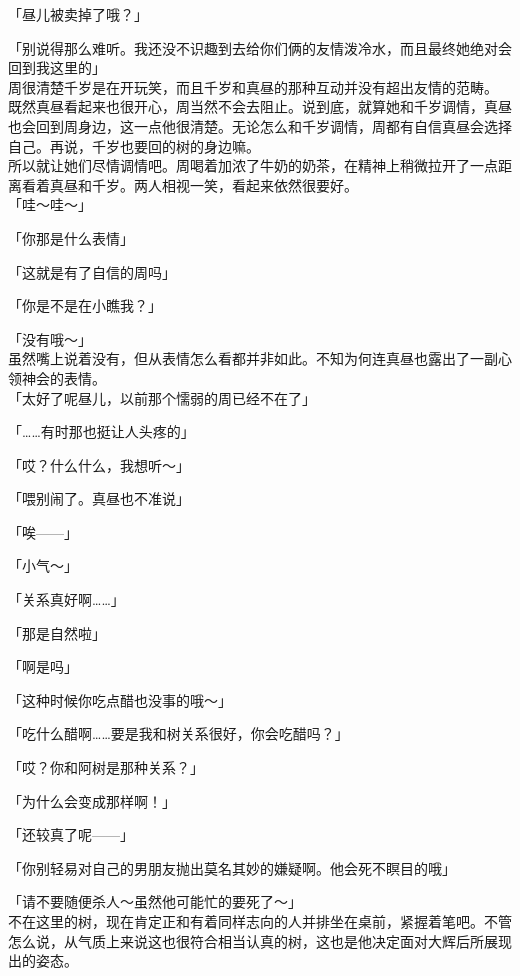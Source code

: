 「昼儿被卖掉了哦？」

「别说得那么难听。我还没不识趣到去给你们俩的友情泼冷水，而且最终她绝对会回到我这里的」\\

周很清楚千岁是在开玩笑，而且千岁和真昼的那种互动并没有超出友情的范畴。\\

既然真昼看起来也很开心，周当然不会去阻止。说到底，就算她和千岁调情，真昼也会回到周身边，这一点他很清楚。无论怎么和千岁调情，周都有自信真昼会选择自己。再说，千岁也要回的树的身边嘛。\\

所以就让她们尽情调情吧。周喝着加浓了牛奶的奶茶，在精神上稍微拉开了一点距离看着真昼和千岁。两人相视一笑，看起来依然很要好。\\

「哇～哇～」

「你那是什么表情」

「这就是有了自信的周吗」

「你是不是在小瞧我？」

「没有哦～」\\

虽然嘴上说着没有，但从表情怎么看都并非如此。不知为何连真昼也露出了一副心领神会的表情。\\

「太好了呢昼儿，以前那个懦弱的周已经不在了」

「……有时那也挺让人头疼的」

「哎？什么什么，我想听～」

「喂别闹了。真昼也不准说」

「唉——」

「小气～」

「关系真好啊……」

「那是自然啦」

「啊是吗」

「这种时候你吃点醋也没事的哦～」

「吃什么醋啊……要是我和树关系很好，你会吃醋吗？」

「哎？你和阿树是那种关系？」

「为什么会变成那样啊！」

「还较真了呢——」

「你别轻易对自己的男朋友抛出莫名其妙的嫌疑啊。他会死不瞑目的哦」

「请不要随便杀人～虽然他可能忙的要死了～」\\

不在这里的树，现在肯定正和有着同样志向的人并排坐在桌前，紧握着笔吧。不管怎么说，从气质上来说这也很符合相当认真的树，这也是他决定面对大辉后所展现出的姿态。\\

